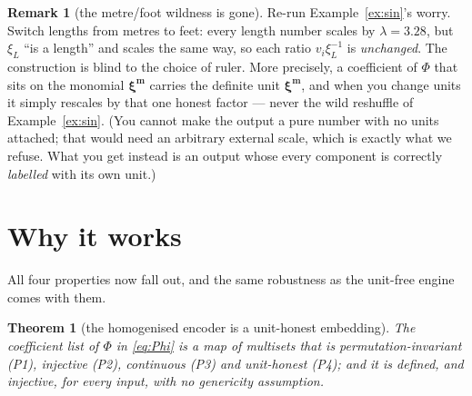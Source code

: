 \documentclass[11pt,a4paper]{article}
\theoremstyle{definition}
\newtheorem{remark}[definition]{Remark}
\theoremstyle{plain}
\newtheorem{theorem}[definition]{Theorem}
\newcommand{\bvec}[1]{\mathbf{#1}}
\begin{document}
\begin{remark}[the metre/foot wildness is gone]\label{rmk:covariant}
Re-run Example~\ref{ex:sin}'s worry. Switch lengths from metres to feet: every
length number scales by $\lambda=3.28$, but $\xi_L$ ``is a length'' and scales the
same way, so each ratio $v_i\xi_L^{-1}$ is \emph{unchanged}. The construction is
blind to the choice of ruler. More precisely, a coefficient of $\Phi$ that sits on
the monomial $\boldsymbol\xi^{\bvec m}$ carries the definite unit
$\boldsymbol\xi^{\bvec m}$, and when you change units it simply rescales by that
one honest factor --- never the wild reshuffle of Example~\ref{ex:sin}. (You cannot
make the output a pure number with no units attached; that would need an arbitrary
external scale, which is exactly what we refuse. What you get instead is an output
whose every component is correctly \emph{labelled} with its own unit.)
\end{remark}

\section{Why it works}
\label{sec:why}

All four properties now fall out, and the same robustness as the unit-free engine
comes with them.

\begin{theorem}[the homogenised encoder is a unit-honest embedding]\label{thm:main}
The coefficient list of $\Phi$ in \eqref{eq:Phi} is a map of multisets that is
permutation-invariant \textup{(P1)}, injective \textup{(P2)}, continuous
\textup{(P3)} and unit-honest \textup{(P4)}; and it is defined, and injective, for
\emph{every} input, with no genericity assumption.
\end{theorem}
\end{document}
